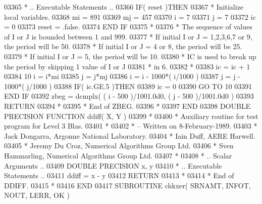\begin{DoxyCode}
03365 \textcolor{comment}{*     .. Executable Statements ..}
03366       \textcolor{keywordflow}{IF}( reset )\textcolor{keywordflow}{THEN}
03367 \textcolor{comment}{*        Initialize local variables.}
03368          mi = 891
03369          mj = 457
03370          i = 7
03371          j = 7
03372          ic = 0
03373          reset = .false.
03374 \textcolor{keywordflow}{      END IF}
03375 \textcolor{comment}{*}
03376 \textcolor{comment}{*     The sequence of values of I or J is bounded between 1 and 999.}
03377 \textcolor{comment}{*     If initial I or J = 1,2,3,6,7 or 9, the period will be 50.}
03378 \textcolor{comment}{*     If initial I or J = 4 or 8, the period will be 25.}
03379 \textcolor{comment}{*     If initial I or J = 5, the period will be 10.}
03380 \textcolor{comment}{*     IC is used to break up the period by skipping 1 value of I or J}
03381 \textcolor{comment}{*     in 6.}
03382 \textcolor{comment}{*}
03383       ic = ic + 1
03384    10 i = i*mi
03385       j = j*mj
03386       i = i - 1000*( i/1000 )
03387       j = j - 1000*( j/1000 )
03388       \textcolor{keywordflow}{IF}( ic.GE.5 )\textcolor{keywordflow}{THEN}
03389          ic = 0
03390          \textcolor{keywordflow}{GO TO} 10
03391 \textcolor{keywordflow}{      END IF}
03392       zbeg = dcmplx( ( i - 500 )/1001.0d0, ( j - 500 )/1001.0d0 )
03393       \textcolor{keywordflow}{RETURN}
03394 \textcolor{comment}{*}
03395 \textcolor{comment}{*     End of ZBEG.}
03396 \textcolor{comment}{*}
03397 \textcolor{keyword}{      END}
03398 \textcolor{keyword}{      DOUBLE PRECISION }\textcolor{keyword}{FUNCTION }ddiff( X, Y )
03399 \textcolor{comment}{*}
03400 \textcolor{comment}{*  Auxiliary routine for test program for Level 3 Blas.}
03401 \textcolor{comment}{*}
03402 \textcolor{comment}{*  -- Written on 8-February-1989.}
03403 \textcolor{comment}{*     Jack Dongarra, Argonne National Laboratory.}
03404 \textcolor{comment}{*     Iain Duff, AERE Harwell.}
03405 \textcolor{comment}{*     Jeremy Du Croz, Numerical Algorithms Group Ltd.}
03406 \textcolor{comment}{*     Sven Hammarling, Numerical Algorithms Group Ltd.}
03407 \textcolor{comment}{*}
03408 \textcolor{comment}{*     .. Scalar Arguments ..}
03409       \textcolor{keywordtype}{DOUBLE PRECISION}   x, y
03410 \textcolor{comment}{*     .. Executable Statements ..}
03411       ddiff = x - y
03412       \textcolor{keywordflow}{RETURN}
03413 \textcolor{comment}{*}
03414 \textcolor{comment}{*     End of DDIFF.}
03415 \textcolor{comment}{*}
03416 \textcolor{keyword}{      END}
03417 \textcolor{keyword}{      SUBROUTINE }chkxer( SRNAMT, INFOT, NOUT, LERR, OK )

\end{DoxyCode}
